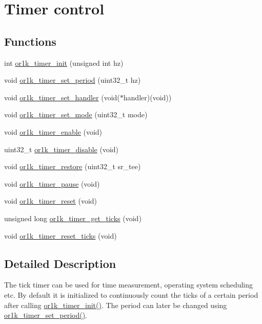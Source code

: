 \hypertarget{group__or1k__timer}{\section{Timer control}
\label{group__or1k__timer}
}
\subsection*{Functions}
\begin{DoxyCompactItemize}
\item 
int \hyperlink{group__or1k__timer_ga432f34016f4f559c29b0be4fbc87e623}{or1k\-\_\-timer\-\_\-init} (unsigned int hz)
\item 
void \hyperlink{group__or1k__timer_gaf760867d2f9d04f0c101c4c4975b0616}{or1k\-\_\-timer\-\_\-set\-\_\-period} (uint32\-\_\-t hz)
\item 
void \hyperlink{group__or1k__timer_ga28914de74748e69a61db1ea7eb1ff553}{or1k\-\_\-timer\-\_\-set\-\_\-handler} (void($\ast$handler)(void))
\item 
void \hyperlink{group__or1k__timer_gad50095aee03012b59fc5b6de5e0e9bdf}{or1k\-\_\-timer\-\_\-set\-\_\-mode} (uint32\-\_\-t mode)
\item 
void \hyperlink{group__or1k__timer_ga369138d63850f2a4dfe216315c31f3d4}{or1k\-\_\-timer\-\_\-enable} (void)
\item 
uint32\-\_\-t \hyperlink{group__or1k__timer_gab40473a360aa82273575cdbc4381ac93}{or1k\-\_\-timer\-\_\-disable} (void)
\item 
void \hyperlink{group__or1k__timer_ga0e392edcf73b9cf1c0279471ae59d241}{or1k\-\_\-timer\-\_\-restore} (uint32\-\_\-t sr\-\_\-tee)
\item 
void \hyperlink{group__or1k__timer_ga48cd5b4c0bcc3c0b5ec28326426a66aa}{or1k\-\_\-timer\-\_\-pause} (void)
\item 
void \hyperlink{group__or1k__timer_ga0bbdc374a3d140e538fc32b48b05df47}{or1k\-\_\-timer\-\_\-reset} (void)
\item 
unsigned long \hyperlink{group__or1k__timer_ga2baa18c5153c793b7d2a85c6e224cea0}{or1k\-\_\-timer\-\_\-get\-\_\-ticks} (void)
\item 
void \hyperlink{group__or1k__timer_ga456bc40cdfbbbdfd62c936c065457cc2}{or1k\-\_\-timer\-\_\-reset\-\_\-ticks} (void)
\end{DoxyCompactItemize}


\subsection{Detailed Description}
The tick timer can be used for time measurement, operating system scheduling etc. By default it is initialized to continuously count the ticks of a certain period after calling \hyperlink{group__or1k__timer_ga432f34016f4f559c29b0be4fbc87e623}{or1k\-\_\-timer\-\_\-init()}. The period can later be changed using \hyperlink{group__or1k__timer_gaf760867d2f9d04f0c101c4c4975b0616}{or1k\-\_\-timer\-\_\-set\-\_\-period()}.

